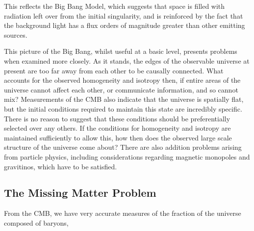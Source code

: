 This reflects the Big Bang Model, which suggests that space is filled with radiation left over from the initial singularity, and is reinforced by the fact that the background light has a flux orders of magnitude greater than other emitting sources.
\par This picture of the Big Bang, whilst useful at a basic level, presents problems when examined more closely. As it stands, the edges of the observable universe at present are too far away from each other to be causally connected. What accounts for the observed homogeneity and isotropy then, if entire areas of the universe cannot affect each other, or communicate information, and so cannot mix? Measurements of the CMB also indicate that the universe is spatially flat, but the initial conditions required to maintain this state are incredibly specific. There is no reason to suggest that these conditions should be preferentially selected over any others. If the conditions for homogeneity and isotropy are maintained sufficiently to allow this, how then does the observed large scale structure of the universe come about? There are also addition problems arising from particle physics, including considerations regarding magnetic monopoles and gravitinos, which have to be satisfied.

\subsection{The Missing Matter Problem}
From the CMB, we have very accurate measures of the fraction of the universe composed of baryons, 